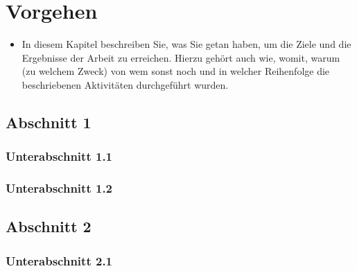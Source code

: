 
\chapter{Vorgehen}

\label{Chapter3}

\begin{itemize}
  \item In diesem Kapitel beschreiben Sie, was Sie getan haben, um die Ziele und die Ergebnisse der Arbeit zu erreichen. Hierzu gehört auch wie, womit, warum (zu welchem Zweck) von wem sonst noch und in welcher Reihenfolge die beschriebenen Aktivitäten durchgeführt wurden.
\end{itemize}

\section{Abschnitt 1}

\subsection{Unterabschnitt 1.1}



\subsection{Unterabschnitt 1.2}



\section{Abschnitt 2}


\subsection{Unterabschnitt 2.1}


